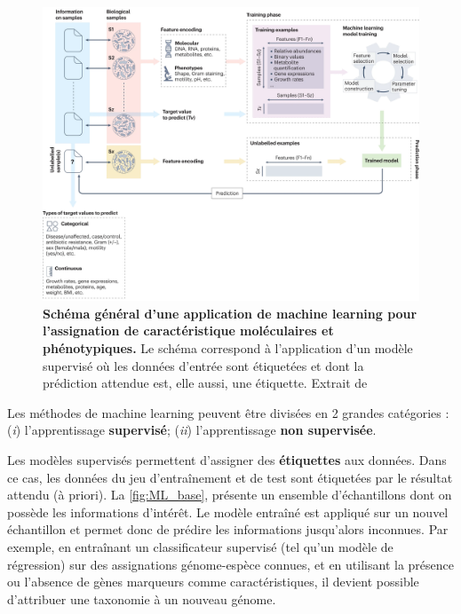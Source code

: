 \begin{figure}[htbp]
    \centering
    \includegraphics[width=\linewidth]{images/ML.png}
    \caption[Schéma général d'une application de machine learning]{\textbf{Schéma général d'une application de machine learning pour l'assignation de caractéristique moléculaires et phénotypiques.} Le schéma correspond à l'application d'un modèle supervisé où les données d'entrée sont étiquetées et dont la prédiction attendue est, elle aussi, une étiquette. Extrait de \cite{asnicar_machine_2024}}
    \label{fig:ML_base}
\end{figure}

\newpage

Les méthodes de machine learning peuvent être divisées en 2 grandes catégories : (\textit{i}) l'apprentissage \textbf{supervisé}; (\textit{ii}) l'apprentissage \textbf{non supervisée}. 

Les modèles supervisés permettent d'assigner des \textbf{étiquettes} aux données. Dans ce cas, les données du jeu d’entraînement et de test sont étiquetées par le résultat attendu (à priori). La \autoref{fig:ML_base}, présente un ensemble d'échantillons dont on possède les informations d'intérêt. Le modèle entraîné est appliqué sur un nouvel échantillon et permet donc de prédire les informations jusqu'alors inconnues. Par exemple, en entraînant un classificateur supervisé (tel qu’un modèle de régression) sur des assignations génome-espèce connues, et en utilisant la présence ou l’absence de gènes marqueurs comme caractéristiques, il devient possible d’attribuer une taxonomie à un nouveau génome.

